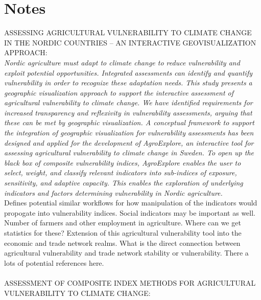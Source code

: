 \chapter{Notes}
ASSESSING AGRICULTURAL VULNERABILITY TO CLIMATE CHANGE IN THE NORDIC COUNTRIES – AN INTERACTIVE GEOVISUALIZATION APPROACH: ~\cite{wirehn2016assessing}\\
\textit{Nordic agriculture must adapt to climate change to reduce vulnerability and exploit potential opportunities. Integrated assessments can identify and quantify vulnerability in order to recognize these adaptation needs. This study presents a geographic visualization approach to support the interactive assessment of agricultural vulnerability to climate change. We have identified requirements for increased transparency and reflexivity in vulnerability assessments, arguing that these can be met by geographic visualization. A conceptual framework to support the integration of geographic visualization for vulnerability assessments has been designed and applied for the development of AgroExplore, an interactive tool for assessing agricultural vulnerability to climate change in Sweden. To open up the black box of composite vulnerability indices, AgroExplore enables the user to select, weight, and classify relevant indicators into sub-indices of exposure, sensitivity, and adaptive capacity. This enables the exploration of underlying indicators and factors determining vulnerability in Nordic agriculture.}\\
Defines potential similar workflows for how manipulation of the indicators would propogate into vulnerability indices. Social indicators may be important as well. Number of farmers and other employment in agriculture. Where can we get statistics for these? Extension of this agricultural vulnerability tool into the economic and trade network realms. What is the direct connection between agricultural vulnerability and trade network stability or vulnerability. There a lots of potential references here.\\
\\
ASSESSMENT OF COMPOSITE INDEX METHODS FOR AGRICULTURAL VULNERABILITY TO CLIMATE CHANGE:~\cite{wirehn2015assessment}\\
